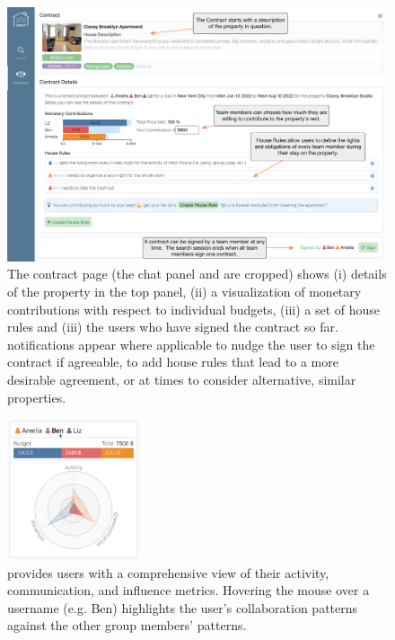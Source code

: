 \begin{figure}
    \centering
    \includegraphics[width=1\textwidth]{images/ui-contracts.pdf}
    \caption{The contract page (the chat panel and \collaboRatio are cropped) shows (i) details of the property in the top panel, (ii) a visualization of monetary contributions with respect to individual budgets, (iii) a set of house rules and (iii) the users who have signed the contract so far. \cbot notifications appear where applicable to nudge the user to sign the contract if agreeable, to add house rules that lead to a more desirable agreement, or at times to consider alternative, similar properties.}
    \label{fig:ui_contracts}
\end{figure}

\begin{figure}
    \includegraphics[width=0.35\textwidth]{images/ui-collaboratio.jpg}
    \caption{\collaboRatio provides users with a comprehensive view of their activity, communication, and influence metrics. Hovering the mouse over a username (e.g. Ben) highlights the user's collaboration patterns against the other group members' patterns.}
    \label{fig:collaboratio}
\end{figure}

